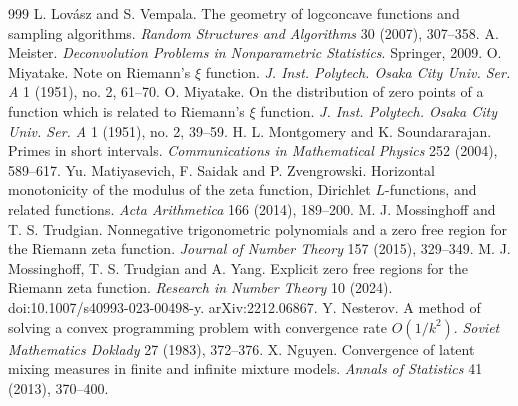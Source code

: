 \begin{thebibliography}{999}
 L. Lov\'asz and S. Vempala. The geometry of logconcave functions and sampling algorithms. \emph{Random Structures and Algorithms} 30 (2007), 307--358.
 A. Meister. \emph{Deconvolution Problems in Nonparametric Statistics}. Springer, 2009.
 O. Miyatake. Note on Riemann's $\xi$ function. \emph{J. Inst. Polytech. Osaka City Univ. Ser. A} 1 (1951), no. 2, 61--70.
 O. Miyatake. On the distribution of zero points of a function which is related to Riemann's $\xi$ function. \emph{J. Inst. Polytech. Osaka City Univ. Ser. A} 1 (1951), no. 2, 39--59.
 H. L. Montgomery and K. Soundararajan. Primes in short intervals. \emph{Communications in Mathematical Physics} 252 (2004), 589--617.
 Yu. Matiyasevich, F. Saidak and P. Zvengrowski. Horizontal monotonicity of the modulus of the zeta function, Dirichlet $L$-functions, and related functions. \emph{Acta Arithmetica} 166 (2014), 189--200.
 M. J. Mossinghoff and T. S. Trudgian. Nonnegative trigonometric polynomials and a zero free region for the Riemann zeta function. \emph{Journal of Number Theory} 157 (2015), 329--349.
 M. J. Mossinghoff, T. S. Trudgian and A. Yang. Explicit zero free regions for the Riemann zeta function. \emph{Research in Number Theory} 10 (2024). doi:10.1007/s40993-023-00498-y. arXiv:2212.06867.
 Y. Nesterov. A method of solving a convex programming problem with convergence rate $O(1/k^2)$. \emph{Soviet Mathematics Doklady} 27 (1983), 372--376.
 X. Nguyen. Convergence of latent mixing measures in finite and infinite mixture models. \emph{Annals of Statistics} 41 (2013), 370--400.

\end{thebibliography}
